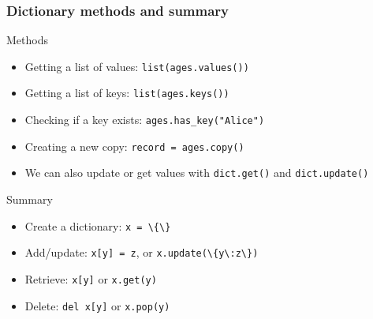 \documentclass[notes]{beamer}
\begin{document}
		
	\begin{frame}[fragile]
		\frametitle{Dictionary methods and summary}
		Methods
		\begin{itemize}
			\item Getting a list of values: \colorbox{codebg}{\lstinline|list(ages.values())|}
			\item Getting a list of keys: \colorbox{codebg}{\lstinline|list(ages.keys())|}
			\item Checking if a key exists: \colorbox{codebg}{\lstinline|ages.has_key("Alice")|}
			\item Creating a new copy: \colorbox{codebg}{\lstinline|record = ages.copy()|}
			\item We can also update or get values with \colorbox{codebg}{\lstinline|dict.get()| and \lstinline|dict.update()|}
		\end{itemize}
		Summary
		\begin{itemize}
			\item Create a dictionary: \colorbox{codebg}{\lstinline|x = \{\}|}
			\item Add/update: \colorbox{codebg}{\lstinline|x[y] = z|}, or \colorbox{codebg}{\lstinline|x.update(\{y\:z\})|}
			\item Retrieve: \colorbox{codebg}{\lstinline|x[y]|} or \colorbox{codebg}{\lstinline|x.get(y)|}
			\item Delete: \colorbox{codebg}{\lstinline|del x[y]|} or \colorbox{codebg}{\lstinline|x.pop(y)|}
		\end{itemize}
	\end{frame}
	
\end{document}
